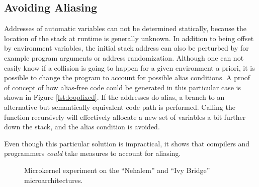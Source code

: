 \documentclass{acm_proc_article-sp}
\begin{document}
\subsection{Avoiding Aliasing}
Addresses of automatic variables can not be determined statically, because the location of the stack at runtime is generally unknown.
In addition to being offset by environment variables, the initial stack address can also be perturbed by for example program arguments or address randomization.
Although one can not easily know if a collision is going to happen for a given environment a priori, it is possible to change the program to account for possible alias conditions.
A proof of concept of how alias-free code could be generated in this particular case is shown in Figure \ref{lst:loopfixed}.
If the addresses do alias, a branch to an alternative but semantically equivalent code path is performed.
Calling the function recursively will effectively allocate a new set of variables a bit further down the stack, and the alias condition is avoided.

Even though this particular solution is impractical, it shows that compilers and programmers \emph{could} take measures to account for aliasing.

\begin{figure}[t]
  \caption{\label{fig:microkernel-all-archs}Microkernel experiment on the ``Nehalem'' and ``Ivy Bridge'' microarchitectures.}
\end{figure}
\end{document}

